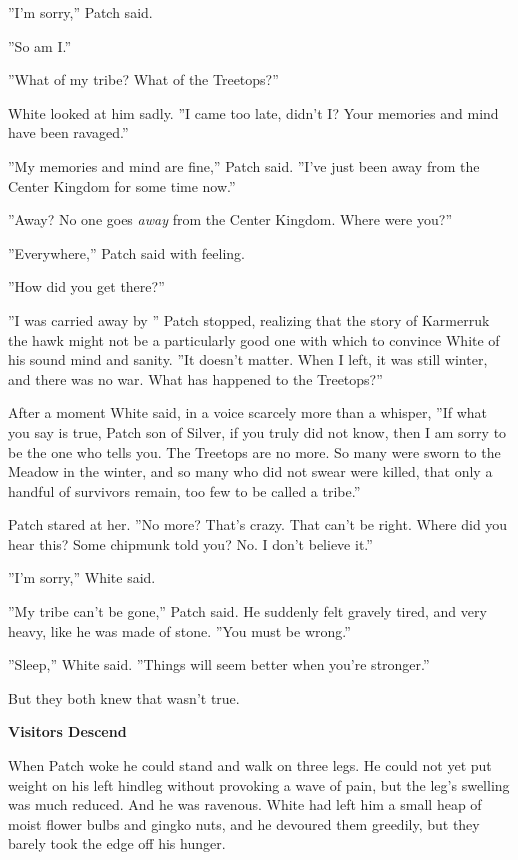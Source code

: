 \documentclass[11pt]{article}
\begin{document}
 ''I'm sorry,'' Patch said.\par
 ''So am I.''\par
 ''What of my tribe? What of the Treetops?''\par
 White looked at him sadly. ''I came too late, didn't I? Your memories and mind have been ravaged.''\par
 ''My memories and mind are fine,'' Patch said. ''I've just been away from the Center Kingdom for some time now.''\par
 ''Away? No one goes {\it away} from the Center Kingdom. Where were you?''\par
 ''Everywhere,'' Patch said with feeling.\par
 ''How did you get there?''\par
 ''I was carried away by %
'' Patch stopped, realizing that the story of Karmerruk the hawk might not be a particularly good one with which to convince White of his sound mind and sanity. ''It doesn't matter. When I left, it was still winter, and there was no war. What has happened to the Treetops?''\par
 After a moment White said, in a voice scarcely more than a whisper, ''If what you say is true, Patch son of Silver, if you truly did not know, then I am sorry to be the one who tells you. The Treetops are no more. So many were sworn to the Meadow in the winter, and so many who did not swear were killed, that only a handful of survivors remain, too few to be called a tribe.''\par
 Patch stared at her. ''No more? That's crazy. That can't be right. Where did you hear this? Some chipmunk told you? No. I don't believe it.''\par
 ''I'm sorry,'' White said.\par
 ''My tribe can't be gone,'' Patch said. He suddenly felt gravely tired, and very heavy, like he was made of stone. ''You must be wrong.''\par
 ''Sleep,'' White said. ''Things will seem better when you're stronger.''\par
 But they both knew that wasn't true.\par
\par
{\bf Visitors Descend\par
}\par
 When Patch woke he could stand and walk on three legs. He could not yet put weight on his left hindleg without provoking a wave of pain, but the leg's swelling was much reduced. And he was ravenous. White had left him a small heap of moist flower bulbs and gingko nuts, and he devoured them greedily, but they barely took the edge off his hunger.\par
\end{document}

